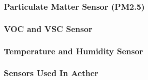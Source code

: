 \subsubsection{Particulate Matter Sensor (PM2.5)}

\subsubsection{VOC and VSC Sensor}

\subsubsection{Temperature and Humidity Sensor}

\subsubsection{Sensors Used In Aether}
